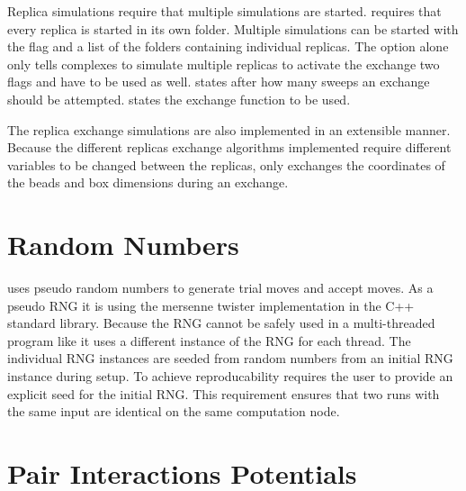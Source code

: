 \documentclass[12pt, twoside]{report}
\begin{document}
Replica simulations require that multiple simulations are started. \complexes
requires that every replica is started in its own folder. Multiple simulations
can be started with the  flag and a list of the folders
containing individual replicas. The  option alone only
tells complexes to simulate multiple replicas to activate the exchange two flags
 and  have to be used as well.
 states after how many sweeps an exchange should be
attempted.  states the exchange function to be used.

The replica exchange simulations are also implemented in an extensible manner.
Because the different replicas exchange algorithms implemented require different
variables to be changed between the replicas, \complexes only exchanges the
coordinates of the beads and box dimensions during an exchange.


\section{Random Numbers}
\complexes uses pseudo random numbers to generate trial moves and accept moves.
As a pseudo \gls{RNG} it is using the mersenne twister \cite{Matsumoto1998}
implementation in the C++ standard library. Because the \gls{RNG} cannot be
safely used in a multi-threaded program like \complexes it uses a different
instance of the \gls{RNG} for each thread. The individual \gls{RNG} instances
are seeded from random numbers from an initial \gls{RNG} instance during setup.
To achieve reproducability \complexes requires the user to provide an explicit
seed for the initial \gls{RNG}. This requirement ensures that two runs with the
same input are identical on the same computation node.

\section{Pair Interactions Potentials}
\end{document}
